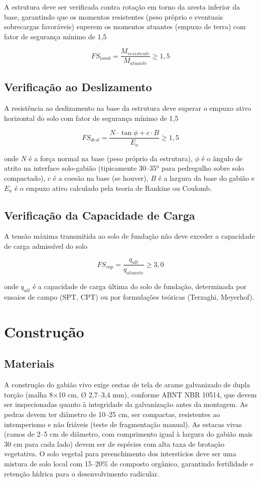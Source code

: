 \documentclass[
  portuguese,
  11pt,
  a4paper,
  open=any]{scrbook}
\begin{document}
A estrutura deve ser verificada contra rotação em torno da aresta
inferior da base, garantindo que os momentos resistentes (peso próprio e
eventuais sobrecargas favoráveis) superem os momentos atuantes (empuxo
de terra) com fator de segurança mínimo de 1,5

\[
FS_{tomb} = \frac{M_{resistente}}{M_{atuante}} \geq 1{,}5
\]

\subsection{Verificação ao
Deslizamento}\label{verificauxe7uxe3o-ao-deslizamento}

A resistência ao deslizamento na base da estrutura deve superar o empuxo
ativo horizontal do solo com fator de segurança mínimo de 1,5

\[
FS_{desl} = \frac{N \cdot \tan \phi + c \cdot B}{E_a} \geq 1{,}5
\]

onde \(N\) é a força normal na base (peso próprio da estrutura),
\(\phi\) é o ângulo de atrito na interface solo-gabião (tipicamente
30--35° para pedregulho sobre solo compactado), \(c\) é a coesão na base
(se houver), \(B\) é a largura da base do gabião e \(E_a\) é o empuxo
ativo calculado pela teoria de Rankine ou Coulomb.

\subsection{Verificação da Capacidade de
Carga}\label{verificauxe7uxe3o-da-capacidade-de-carga}

A tensão máxima transmitida ao solo de fundação não deve exceder a
capacidade de carga admissível do solo

\[
FS_{cap} = \frac{q_{ult}}{q_{atuante}} \geq 3{,}0
\]

onde \(q_{ult}\) é a capacidade de carga última do solo de fundação,
determinada por ensaios de campo (SPT, CPT) ou por formulações teóricas
(Terzaghi, Meyerhof).

\section{Construção}\label{construuxe7uxe3o-1}

\subsection{Materiais}\label{materiais-2}

A construção do gabião vivo exige cestas de tela de arame galvanizado de
dupla torção (malha 8×10 cm, Ø 2,7--3,4 mm), conforme ABNT NBR 10514,
que devem ser inspecionadas quanto à integridade da galvanização antes
da montagem. As pedras devem ter diâmetro de 10--25 cm, ser compactas,
resistentes ao intemperismo e não friáveis (teste de fragmentação
manual). As estacas vivas (ramos de 2--5 cm de diâmetro, com comprimento
igual à largura do gabião mais 30 cm para cada lado) devem ser de
espécies com alta taxa de brotação vegetativa. O solo vegetal para
preenchimento dos interstícios deve ser uma mistura de solo local com
15--20\% de composto orgânico, garantindo fertilidade e retenção hídrica
para o desenvolvimento radicular.
\end{document}
